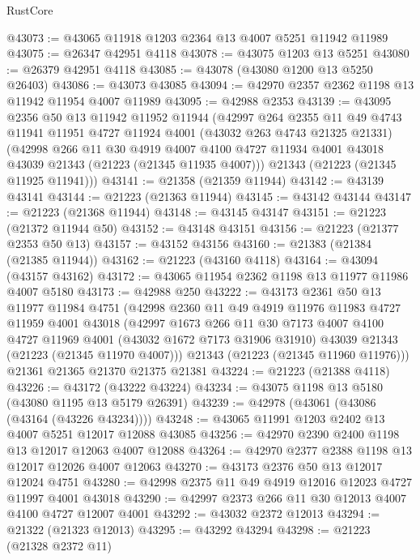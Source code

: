 \begin{lexlean}{RustCore}
\begin{coremodule}
@43073 := @43065 @11918 @1203 @2364 @13 @4007 @5251 @11942 @11989
@43075 := @26347 @42951 @4118
@43078 := @43075 @1203 @13 @5251
@43080 := @26379 @42951 @4118
@43085 := @43078 (@43080 @1200 @13 @5250 @26403)
@43086 := @43073 @43085
@43094 := @42970 @2357 @2362 @1198 @13 @11942 @11954 @4007 @11989
@43095 := @42988 @2353
@43139 := @43095
    @2356
    @50
    @13
    @11942
    @11952
    @11944
    (@42997
      @264
      @2355
      @11
      @49
      @4743
      @11941
      @11951
      @4727
      @11924
      @4001
      (@43032 @263 @4743 @21325 @21331)
      (@42998
        @266
        @11
        @30
        @4919
        @4007
        @4100
        @4727
        @11934
        @4001
        @43018
        @43039
        @21343
        (@21223 (@21345 @11935 @4007)))
      @21343
      (@21223 (@21345 @11925 @11941)))
@43141 := @21358 (@21359 @11944)
@43142 := @43139 @43141
@43144 := @21223 (@21363 @11944)
@43145 := @43142 @43144
@43147 := @21223 (@21368 @11944)
@43148 := @43145 @43147
@43151 := @21223 (@21372 @11944 @50)
@43152 := @43148 @43151
@43156 := @21223 (@21377 @2353 @50 @13)
@43157 := @43152 @43156
@43160 := @21383 (@21384 (@21385 @11944))
@43162 := @21223 (@43160 @4118)
@43164 := @43094 (@43157 @43162)
@43172 := @43065 @11954 @2362 @1198 @13 @11977 @11986 @4007 @5180
@43173 := @42988 @250
@43222 := @43173
    @2361
    @50
    @13
    @11977
    @11984
    @4751
    (@42998
      @2360
      @11
      @49
      @4919
      @11976
      @11983
      @4727
      @11959
      @4001
      @43018
      (@42997
        @1673
        @266
        @11
        @30
        @7173
        @4007
        @4100
        @4727
        @11969
        @4001
        (@43032 @1672 @7173 @31906 @31910)
        @43039
        @21343
        (@21223 (@21345 @11970 @4007)))
      @21343
      (@21223 (@21345 @11960 @11976)))
    @21361
    @21365
    @21370
    @21375
    @21381
@43224 := @21223 (@21388 @4118)
@43226 := @43172 (@43222 @43224)
@43234 := @43075 @1198 @13 @5180 (@43080 @1195 @13 @5179 @26391)
@43239 := @42978 (@43061 (@43086 (@43164 (@43226 @43234))))
@43248 := @43065 @11991 @1203 @2402 @13 @4007 @5251 @12017 @12088 @43085
@43256 := @42970 @2390 @2400 @1198 @13 @12017 @12063 @4007 @12088
@43264 := @42970 @2377 @2388 @1198 @13 @12017 @12026 @4007 @12063
@43270 := @43173 @2376 @50 @13 @12017 @12024 @4751
@43280 := @42998 @2375 @11 @49 @4919 @12016 @12023 @4727 @11997 @4001 @43018
@43290 := @42997 @2373 @266 @11 @30 @12013 @4007 @4100 @4727 @12007 @4001
@43292 := @43032 @2372 @12013
@43294 := @21322 (@21323 @12013)
@43295 := @43292 @43294
@43298 := @21223 (@21328 @2372 @11)

\end{coremodule}
\end{lexlean}
